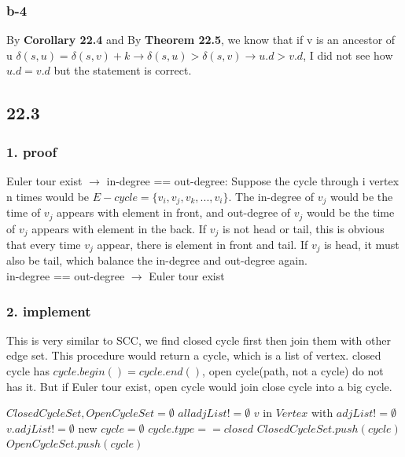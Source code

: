 \documentclass[]{article}
\begin{document}
\subsubsection{b-4}

By \textbf{Corollary 22.4} and By \textbf{Theorem 22.5}, we know that if v is an ancestor of u $\delta (s, u) = \delta(s, v) + k \rightarrow \delta(s, u) > \delta (s, v) \rightarrow u.d > v.d$, I did not see how $u.d = v.d$ but the statement is correct.

\subsection{22.3}

\subsubsection{1. proof}

Euler tour exist $\rightarrow$ in-degree == out-degree: Suppose the cycle through i vertex n times would be $E-cycle = \{ v_{i}, v_{j}, v_{k}, ... , v_{i} \}$. The in-degree of $v_{j}$ would be the time of  $v_{j}$ appears with element in front, and out-degree of $v_{j}$ would be the time of $v_{j}$ appears with element in the back. If $v_{j}$ is not head or tail, this is obvious that every time $v_{j}$ appear, there is element in front and tail. If $v_{j}$ is head, it must also be tail, which balance the in-degree and out-degree again.\\

in-degree == out-degree $\rightarrow$ Euler tour exist

\subsubsection{2. implement}

This is very similar to SCC, we find closed cycle first then join them with other edge set. This procedure would return a cycle, which is a list of vertex. closed cycle has $cycle.begin() = cycle.end()$, open cycle(path, not a cycle) do not has it. But if Euler tour exist, open cycle would join close cycle into a big cycle.

\begin{codebox}
	
	\li $ClosedCycleSet, OpenCycleSet = \emptyset$
	\li \While $all adjList != \emptyset$ \Do
	\li \For $v$ in $Vertex$ with $adjList != \emptyset$\Do
	\li \If $v.adjList != \emptyset$ \Then
	\li new $cycle = \emptyset$
	\li {}
	\li \If $cycle.type == closed$
	\li \Then $ClosedCycleSet.push(cycle)$
	\li \Else $OpenCycleSet.push(cycle)$
	
\end{codebox}
\end{document}
